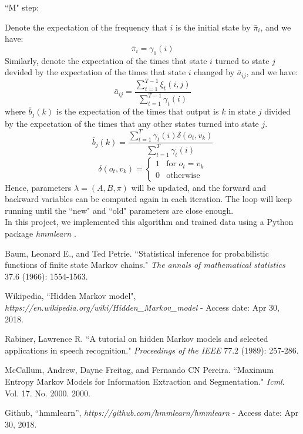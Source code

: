 \documentclass[conference]{IEEEtran}
\begin{document}
\noindent ``M" step:

Denote the expectation of the frequency that $i$ is the initial state by $\bar{\pi}_i$, and we have:
\begin{equation}
\bar{\pi}_i=\gamma_1(i)
\end{equation}
Similarly, denote the expectation of the times that state $i$ turned to state $j$ devided by the expectation of the times that state $i$ changed by $\bar{a}_{ij}$, and we have:
\begin{equation}
\bar{a}_{ij}=\frac{\sum_{t=1}^{T-1}\xi_t(i,j)}{\sum_{t=1}^{T-1}\gamma_t(i)}
\end{equation}
where $\bar{b}_j(k)$ is the expectation of the times that output is $k$ in state $j$ divided by the expectation of the times that any other states turned into state $j$.
\begin{equation}
\bar{b}_j(k)=\frac{\sum_{t=1}^T\gamma_t(i)\delta(o_t,v_k)}{\sum_{t=1}^T\gamma_t(i)}
\end{equation}
\begin{equation}
\delta(o_t,v_k)=\left \{ 
\begin{array}{ll}
1&\text{for }o_t=v_k\\
0&\text{otherwise}
\end{array}
\right.
\end{equation}
Hence, parameters $\lambda=(A,B,\pi)$ will be updated, and the forward and backward variables can be computed again in each iteration. The loop will keep running until the ``new" and ``old" parameters are close enough.\\

In this project, we implemented this algorithm and trained data using a Python package \textit{hmmlearn} \cite{hmm5}. 


\begin{thebibliography}{00}
Baum, Leonard E., and Ted Petrie. ``Statistical inference for probabilistic functions of finite state Markov chains." \textit{The annals of mathematical statistics} 37.6 (1966): 1554-1563.

Wikipedia, ``Hidden Markov model",\\ \textit{https://en.wikipedia.org/wiki/Hidden\_Markov\_model} - Access date: Apr 30, 2018.

Rabiner, Lawrence R. ``A tutorial on hidden Markov models and selected applications in speech recognition." \textit{Proceedings of the IEEE} 77.2 (1989): 257-286.

McCallum, Andrew, Dayne Freitag, and Fernando CN Pereira. ``Maximum Entropy Markov Models for Information Extraction and Segmentation." \textit{Icml}. Vol. 17. No. 2000. 2000.

Github, ``hmmlearn”, \textit{https://github.com/hmmlearn/hmmlearn} - Access date: Apr 30, 2018.

\end{thebibliography}
\end{document}
